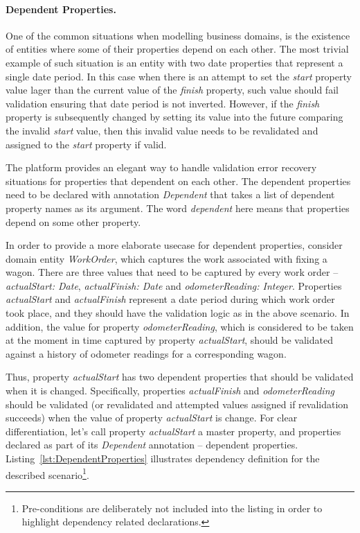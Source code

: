   \paragraph*{Dependent Properties.}

  One of the common situations when modelling business domains, is the existence of entities where some of their properties depend on each other.
  The most trivial example of such situation is an entity with two date properties that represent a single date period.
  In this case when there is an attempt to set the \emph{start} property value lager than the current value of the \emph{finish} property, such value should fail validation ensuring that date period is not inverted.
  However, if the \emph{finish} property is subsequently changed by setting its value into the future comparing the invalid \emph{start} value, then this invalid value needs to be revalidated and assigned to the \emph{start} property if valid.
  
  The platform provides an elegant way to handle validation error recovery situations for properties that dependent on each other. 
  The dependent properties need to be declared with annotation \emph{Dependent} that takes a list of dependent property names as its argument. 
  The word \emph{dependent} here means that properties depend on some other property. 
  
  In order to provide a more elaborate usecase for dependent properties, consider domain entity \emph{WorkOrder}, which captures the work associated with fixing a wagon.
  There are three values that need to be captured by every work order -- \emph{actualStart: Date}, \emph{actualFinish: Date} and \emph{odometerReading: Integer}.
  Properties \emph{actualStart} and \emph{actualFinish} represent a date period during which work order took place, and they should have the validation logic as in the above scenario.
  In addition, the value for property \emph{odometerReading}, which is considered to be taken at the moment in time captured by property \emph{actualStart}, should be validated against a history of odometer readings for a corresponding wagon.

  Thus, property \emph{actualStart} has two dependent properties that should be validated when it is changed.
  Specifically, properties \emph{actualFinish} and \emph{odometerReading} should be validated (or revalidated and attempted values assigned if revalidation succeeds) when the value of property \emph{actualStart} is change.
  For clear differentiation, let's call property \emph{actualStart} a master property, and properties declared as part of its \emph{Dependent} annotation -- dependent properties.
  Listing~\ref{lst:DependentProperties} illustrates dependency definition for the described scenario\footnote{Pre-conditions are deliberately not included into the listing in order to highlight dependency related declarations.}.

